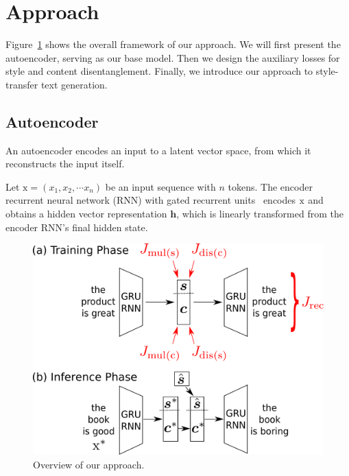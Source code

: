 \documentclass[11pt,a4paper]{article}
\newcommand{\rmx}{\mathrm x}
\begin{document}
\section{Approach}
Figure~\ref{fig:overview} shows the overall framework of our approach. We will first present the autoencoder, serving as our base model. Then we design the auxiliary losses for style and content disentanglement.
Finally, we introduce our approach to style-transfer text generation.


\subsection{Autoencoder} \label{ssec:seq2seq-autoencoder}

An autoencoder encodes an input to a latent vector space, from which it reconstructs the input itself.

Let $\rmx=(x_1, x_2, \cdots x_n)$ be an input sequence with $n$ tokens.
The encoder recurrent neural network (RNN) with gated recurrent units~\cite[GRUs,][]{cho2014learning} encodes $\rm x$ and obtains a hidden vector representation $\bm h$, which is linearly transformed from the encoder RNN's final hidden state.

\begin{figure}[!t]
	\centering
	\includegraphics[width=.9\linewidth]{model-overview}
	\caption{Overview of our approach.}
	\label{fig:overview}
\end{figure}
\end{document}
